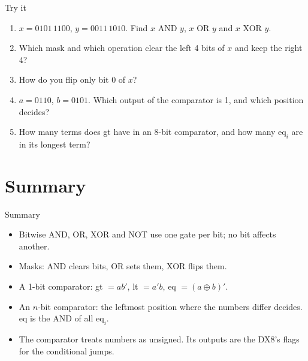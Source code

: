 \documentclass[10pt]{wosm-slides}
\begin{document}
\begin{frame}{Try it}
  \begin{enumerate}
    \item $x = 0101\,1100$, $y = 0011\,1010$. Find $x$ AND $y$, $x$ OR $y$ and
      $x$ XOR $y$.\par
    \item Which mask and which operation clear the left 4 bits of $x$ and keep the
      right 4?\par
    \item How do you flip only bit 0 of $x$?\par
    \item $a = 0110$, $b = 0101$. Which output of the comparator is 1, and which
      position decides?\par
    \item How many terms does gt have in an 8-bit comparator, and how many
      $\mathrm{eq}_i$ are in its longest term?\par
  \end{enumerate}
\end{frame}

\section{Summary}

\begin{frame}{Summary}
  \begin{itemize}
    \item Bitwise AND, OR, XOR and NOT use one gate per bit; no bit affects another.
    \item Masks: AND clears bits, OR sets them, XOR flips them.
    \item A 1-bit comparator: gt $= a b'$, lt $= a' b$, eq $= (a \oplus b)'$.
    \item An $n$-bit comparator: the leftmost position where the numbers differ
      decides. eq is the AND of all $\mathrm{eq}_i$.
    \item The comparator treats numbers as unsigned. Its outputs are the DX8's flags
      for the conditional jumps.
  \end{itemize}
\end{frame}
\end{document}
